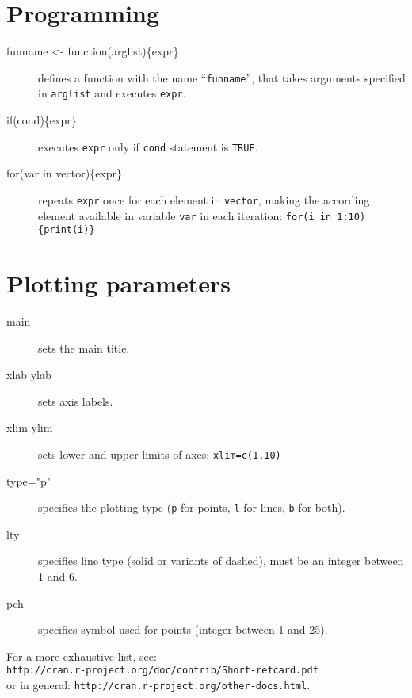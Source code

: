 \documentclass[a4paper,9pt]{extarticle}
\begin{document}
\begin{multicols}{3}
\section{Programming}
\begin{description}
\item[funname <- function(arglist)\{expr\}] defines a function with the name ``\texttt{funname}'', that takes arguments specified in \texttt{arglist} and executes \texttt{expr}.
\item[if(cond)\{expr\}] executes \texttt{expr} only if \texttt{cond} statement is \texttt{TRUE}.
\item[for(var in vector)\{expr\}] repeats \texttt{expr} once for each element in \texttt{vector}, making the according element available in variable \texttt{var} in each iteration: \texttt{for(i in 1:10)\{print(i)\}}
\end{description}

\section{Plotting parameters}
\begin{description}
\item[main] sets the main title.
\item[xlab ylab] sets axis labels.
\item[xlim ylim] sets lower and upper limits of axes: \texttt{xlim=c(1,10)}
\item[type="p"] specifies the plotting type (\texttt{p} for points, \texttt{l} for lines, \texttt{b} for both).
\item[lty] specifies line type (solid or variants of dashed), must be an integer between 1 and 6.
\item[pch] specifies symbol used for points (integer between 1 and 25).
\end{description}

\vspace{0.3cm}
\noindent
{\footnotesize For a more exhaustive list, see:\\ 
\texttt{http://cran.r-project.org/doc/contrib/Short-refcard.pdf}\\
or in general: \texttt{http://cran.r-project.org/other-docs.html}.}
\end{multicols}
\end{document}
